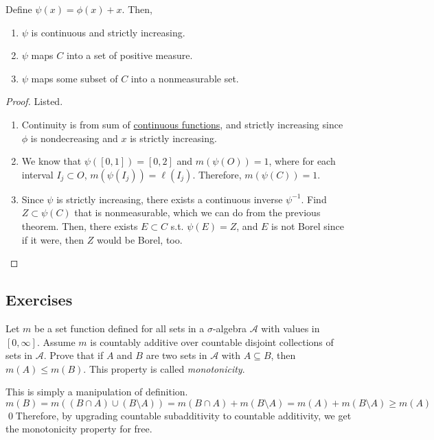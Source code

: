   \begin{theorem}
    \label{thm:pathological-devils-staircase}
    Define $\psi (x) = \phi(x) + x$. Then, 
    \begin{enumerate}
      \item $\psi$ is continuous and strictly increasing. 
      \item $\psi$ maps $C$ into a set of positive measure. 
      \item $\psi$ maps some subset of $C$ into a nonmeasurable set. 
    \end{enumerate}
  \end{theorem}
  \begin{proof}
    Listed. 
    \begin{enumerate}
      \item Continuity is from sum of \hyperref[pst-def:continuous_func]{continuous functions}, and strictly increasing since $\phi$ is nondecreasing and $x$ is strictly increasing. 
      \item We know that $\psi([0, 1]) = [0, 2]$ and $m(\psi(O))= 1$, where for each interval $I_j \subset O$, $m(\psi(I_j)) = \ell(I_j)$. Therefore, $m(\psi(C)) = 1$. 
      \item Since $\psi$ is strictly increasing, there exists a continuous inverse $\psi^{-1}$. Find $Z \subset \psi(C)$ that is nonmeasurable, which we can do from the previous theorem. Then, there exists $E \subset C$ s.t. $\psi(E) = Z$, and $E$ is not Borel since if it were, then $Z$ would be Borel, too. 
    \end{enumerate}
  \end{proof}

\subsection{Exercises} 

  \begin{exercise}[Royden 2.1]
    Let $m$ be a set function defined for all sets in a $\sigma$-algebra $\mathcal{A}$ with values in $[0, \infty]$. Assume $m$ is countably additive over countable disjoint collections of sets in $\mathcal{A}$. Prove that if $A$ and $B$ are two sets in $\mathcal{A}$ with $A \subseteq B$, then $m(A) \leq m(B)$. This property is called \emph{monotonicity}.
  \end{exercise}
  \begin{solution}
    This is simply a manipulation of definition. 
    \begin{equation}
      m(B) = m((B \cap A) \cup (B \setminus A)) = m(B \cap A) + m(B \setminus A) = m(A) + m(B \setminus A) \geq m(A)
    \end{equation} 
    \qed Therefore, by upgrading countable subadditivity to countable additivity, we get the monotonicity property for free.  
  \end{solution}

